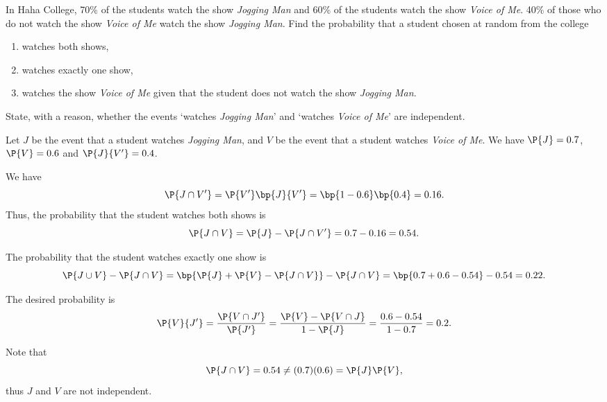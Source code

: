 \begin{problem}
    In Haha College, 70\% of the students watch the show \textit{Jogging Man} and 60\% of the students watch the show \textit{Voice of Me}. 40\% of those who do not watch the show \textit{Voice of Me} watch the show \textit{Jogging Man}. Find the probability that a student chosen at random from the college
    \begin{enumerate}
        \item watches both shows,
        \item watches exactly one show,
        \item watches the show \textit{Voice of Me} given that the student does not watch the show \textit{Jogging Man}.
    \end{enumerate}

    State, with a reason, whether the events `watches \textit{Jogging Man}' and `watches \textit{Voice of Me}' are independent.
\end{problem}
\begin{solution}
    Let $J$ be the event that a student watches \textit{Jogging Man}, and $V$ be the event that a student watches \textit{Voice of Me}. We have $\P{J} = 0.7$, $\P{V} = 0.6$ and $\P{J}{V'} = 0.4$.

    \begin{ppart}
        We have \[\P{J \cap V'} = \P{V'} \bp{J}{V'} = \bp{1 - 0.6} \bp{0.4} = 0.16.\] Thus, the probability that the student watches both shows is \[\P{J \cap V} = \P{J} - \P{J \cap V'} = 0.7 - 0.16 = 0.54.\]
    \end{ppart}
    \begin{ppart}
        The probability that the student watches exactly one show is \[\P{J \cup V} - \P{J \cap V} = \bp{\P{J} + \P{V} - \P{J \cap V}} - \P{J \cap V} = \bp{0.7 + 0.6 - 0.54} - 0.54 = 0.22.\]
    \end{ppart}
    \begin{ppart}
        The desired probability is \[\P{V}{J'} = \frac{\P{V \cap J'}}{\P{J'}} = \frac{\P{V} - \P{V \cap J}}{1 - \P{J}} = \frac{0.6 - 0.54}{1 - 0.7} = 0.2.\]
    \end{ppart}

    Note that \[\P{J \cap V} = 0.54 \neq (0.7)(0.6) = \P{J} \P{V},\] thus $J$ and $V$ are not independent.
\end{solution}

